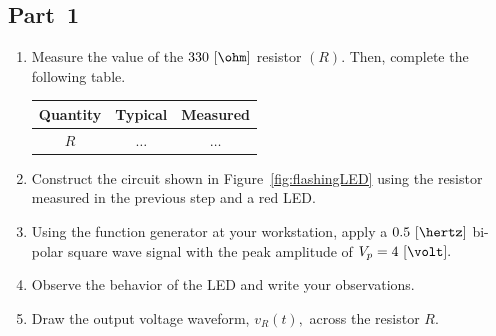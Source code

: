 \subsection{Part~1}
\label{sec:part1}
\begin{enumerate}

 
\item Measure the value of the $330~[\ohm]$ resistor $(R).$ Then, complete the following table.
%
%
  \begin{center}
    \begin{tabular}{c|c|c}
      \toprule
      Quantity &  Typical & Measured\\
      \toprule
      $R$ & $\ldots$ & $\ldots$\\   %
      \bottomrule
    \end{tabular}    
  \end{center}
  
\item Construct the circuit shown in Figure~\ref{fig:flashingLED} using the resistor measured in the previous step and a red LED. 

\item  Using the function generator at your workstation, apply a $0.5~[\hertz]$ bi-polar square wave signal with the  peak amplitude of $V_p = 4~[\volt].$  %

\item Observe the behavior of the LED and write your observations. 

\item Draw the output voltage waveform, $v_R(t),$  across the resistor $R.$ 
    

  \begin{center}
  \end{center}
   
\end{enumerate}


